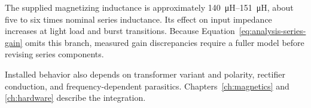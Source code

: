 The supplied magnetizing inductance is approximately \SIrange{140}{151}{\micro\henry}, about five to six times nominal series inductance. Its effect on input impedance increases at light load and burst transitions. Because Equation~\eqref{eq:analysis-series-gain} omits this branch, measured gain discrepancies require a fuller model before revising series components.

Installed behavior also depends on transformer variant and polarity, rectifier conduction, and frequency-dependent parasitics. Chapters~\ref{ch:magnetics} and \ref{ch:hardware} describe the integration.
